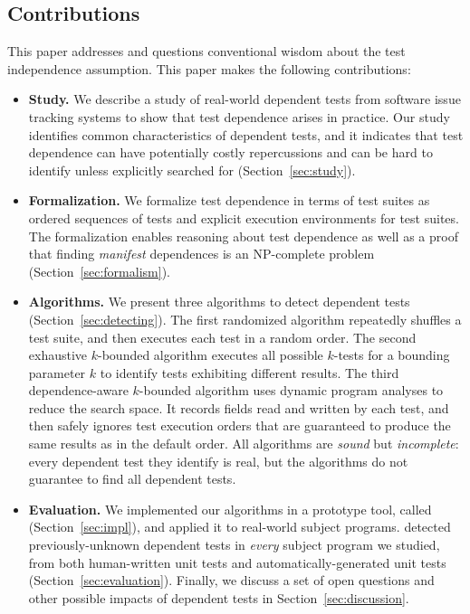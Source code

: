 \subsection{Contributions}
\label{sec:contributions}

This paper addresses and questions
conventional wisdom about the test independence assumption. 
This paper makes the following contributions:

\begin{itemize}

  \item \textbf{Study.} We describe a study of \dtnum real-world
  dependent tests from \repnum software issue tracking
  systems to show that test dependence
  arises in practice. Our study identifies common
  characteristics of dependent tests, and
  it indicates that test dependence can have
  potentially costly repercussions and can be hard to identify unless
  explicitly searched for (Section~\ref{sec:study}).

\item \textbf{Formalization.} We formalize test dependence
  in terms of test suites as ordered sequences of tests and explicit execution
  environments for test suites.  The formalization enables reasoning about test dependence
  as well as a proof that finding \emph{manifest} dependences is an NP-complete
  problem (Section~\ref{sec:formalism}).

  \item \textbf{Algorithms.} We present three algorithms
  to detect dependent tests (Section~\ref{sec:detecting}).
  The first randomized algorithm repeatedly shuffles a test suite,
  and then executes each test in a random order.
  The second exhaustive $k$-bounded algorithm
  executes all possible $k$-tests for
  a bounding parameter $k$ to identify tests exhibiting different results.
  The third dependence-aware $k$-bounded
  algorithm uses dynamic program analyses
  to reduce the search space. It records fields read and
  written by each test, and then safely ignores test execution orders
  that are guaranteed to produce the same results as in the default
  order. All algorithms are \emph{sound} but \emph{incomplete}:
  every dependent test they identify is real, but the algorithms
  do not guarantee to find all dependent tests. 

  \item \textbf{Evaluation.} We implemented our algorithms in a prototype
  tool, called \ourtool (Section~\ref{sec:impl}), and applied it to \subjnum real-world subject programs.
  \ourtool detected previously-unknown dependent tests in \textit{every}
  subject program we studied, from both human-written unit tests and automatically-generated
  unit tests (Section~\ref{sec:evaluation}).
  Finally, we discuss a set of open questions and other possible impacts of dependent
  tests in Section~\ref{sec:discussion}.
\end{itemize}



